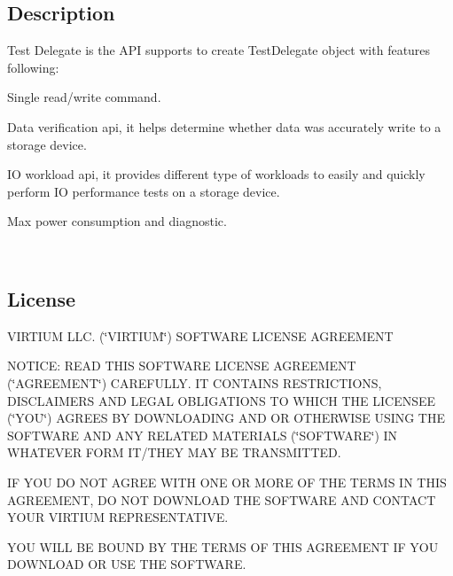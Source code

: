 \subsection*{Description}



 Test Delegate is the A\+PI supports to create Test\+Delegate object with features following\+: 
\begin{DoxyItemize}
\item Single read/write command. 
\item Data verification api, it helps determine whether data was accurately write to a storage device. 
\item IO workload api, it provides different type of workloads to easily and quickly perform IO performance tests on a storage device. 
\item Max power consumption and diagnostic. 
\end{DoxyItemize}~\newline
 \subsection*{License}



 V\+I\+R\+T\+I\+UM L\+LC. (\char`\"{}\+V\+I\+R\+T\+I\+U\+M\char`\"{}) S\+O\+F\+T\+W\+A\+RE L\+I\+C\+E\+N\+SE A\+G\+R\+E\+E\+M\+E\+NT

N\+O\+T\+I\+CE\+: R\+E\+AD T\+H\+IS S\+O\+F\+T\+W\+A\+RE L\+I\+C\+E\+N\+SE A\+G\+R\+E\+E\+M\+E\+NT (\char`\"{}\+A\+G\+R\+E\+E\+M\+E\+N\+T\char`\"{}) C\+A\+R\+E\+F\+U\+L\+LY. IT C\+O\+N\+T\+A\+I\+NS R\+E\+S\+T\+R\+I\+C\+T\+I\+O\+NS, D\+I\+S\+C\+L\+A\+I\+M\+E\+RS A\+ND L\+E\+G\+AL O\+B\+L\+I\+G\+A\+T\+I\+O\+NS TO W\+H\+I\+CH T\+HE L\+I\+C\+E\+N\+S\+EE (\char`\"{}\+Y\+O\+U\char`\"{}) A\+G\+R\+E\+ES BY D\+O\+W\+N\+L\+O\+A\+D\+I\+NG A\+ND OR O\+T\+H\+E\+R\+W\+I\+SE U\+S\+I\+NG T\+HE S\+O\+F\+T\+W\+A\+RE A\+ND A\+NY R\+E\+L\+A\+T\+ED M\+A\+T\+E\+R\+I\+A\+LS (\char`\"{}\+S\+O\+F\+T\+W\+A\+R\+E\char`\"{}) IN W\+H\+A\+T\+E\+V\+ER F\+O\+RM I\+T/\+T\+H\+EY M\+AY BE T\+R\+A\+N\+S\+M\+I\+T\+T\+ED.

IF Y\+OU DO N\+OT A\+G\+R\+EE W\+I\+TH O\+NE OR M\+O\+RE OF T\+HE T\+E\+R\+MS IN T\+H\+IS A\+G\+R\+E\+E\+M\+E\+NT, DO N\+OT D\+O\+W\+N\+L\+O\+AD T\+HE S\+O\+F\+T\+W\+A\+RE A\+ND C\+O\+N\+T\+A\+CT Y\+O\+UR V\+I\+R\+T\+I\+UM R\+E\+P\+R\+E\+S\+E\+N\+T\+A\+T\+I\+VE.

Y\+OU W\+I\+LL BE B\+O\+U\+ND BY T\+HE T\+E\+R\+MS OF T\+H\+IS A\+G\+R\+E\+E\+M\+E\+NT IF Y\+OU D\+O\+W\+N\+L\+O\+AD OR U\+SE T\+HE S\+O\+F\+T\+W\+A\+RE.


